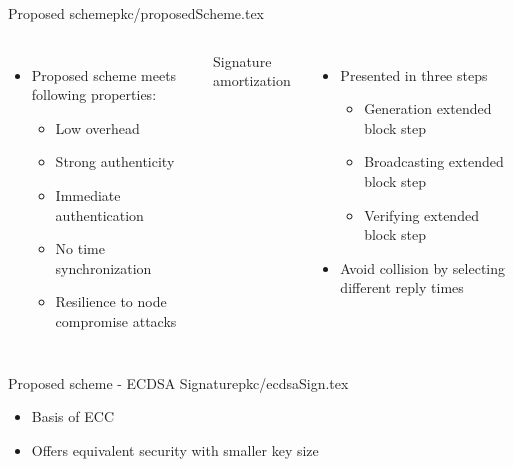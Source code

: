 \begin{notedFrame}{Proposed scheme}{pkc/proposedScheme.tex}
    \begin{columns}[T, onlytextwidth]
            \begin{itemize}
                \item Proposed scheme meets following properties:
                \begin{itemize}
                    \item Low overhead
                    \item Strong authenticity
                    \item Immediate authentication
                    \item No time synchronization
                    \item Resilience to node compromise attacks
                \end{itemize}
            \end{itemize}
            
            \alert{Signature amortization}
            \begin{itemize}
                \item Presented in three steps
                \begin{itemize}
                    \item Generation extended block step
                    \item Broadcasting extended block step
                    \item Verifying extended block step
                \end{itemize}
                \item Avoid collision by selecting different reply times
            \end{itemize}
    \end{columns}
\end{notedFrame}


\begin{notedFrame}{Proposed scheme - ECDSA Signature}{pkc/ecdsaSign.tex}
    \begin{itemize}
        \item Basis of ECC
        \item Offers equivalent security with smaller key size
    \end{itemize}
\end{notedFrame}


